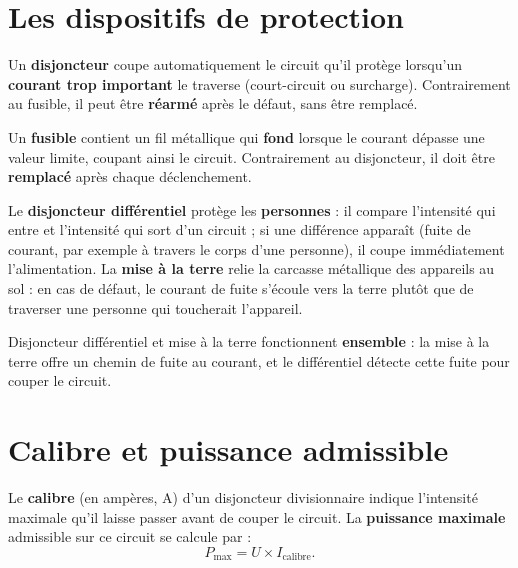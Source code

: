 \section{Les dispositifs de protection}

\begin{propriete}[Disjoncteur]
Un \textbf{disjoncteur} coupe automatiquement le circuit qu'il protège lorsqu'un
\textbf{courant trop important} le traverse (court-circuit ou surcharge). Contrairement
au fusible, il peut être \textbf{réarmé} après le défaut, sans être remplacé.
\end{propriete}

\begin{propriete}[Fusible]
Un \textbf{fusible} contient un fil métallique qui \textbf{fond} lorsque le courant
dépasse une valeur limite, coupant ainsi le circuit. Contrairement au disjoncteur, il doit
être \textbf{remplacé} après chaque déclenchement.
\end{propriete}

\begin{propriete}
Le \textbf{disjoncteur différentiel} protège les \textbf{personnes} : il compare
l'intensité qui entre et l'intensité qui sort d'un circuit ; si une différence apparaît
(fuite de courant, par exemple à travers le corps d'une personne), il coupe
immédiatement l'alimentation. La \textbf{mise à la terre} relie la carcasse métallique
des appareils au sol : en cas de défaut, le courant de fuite s'écoule vers la terre plutôt
que de traverser une personne qui toucherait l'appareil.
\end{propriete}

\begin{remarque}
Disjoncteur différentiel et mise à la terre fonctionnent \textbf{ensemble} : la mise à la
terre offre un chemin de fuite au courant, et le différentiel détecte cette fuite pour
couper le circuit.
\end{remarque}

\section{Calibre et puissance admissible}

\begin{definition}
Le \textbf{calibre} (en ampères, A) d'un disjoncteur divisionnaire indique l'intensité
maximale qu'il laisse passer avant de couper le circuit. La \textbf{puissance maximale}
admissible sur ce circuit se calcule par :
\[
P_{\max}=U\times I_{\text{calibre}}.
\]
\end{definition}

